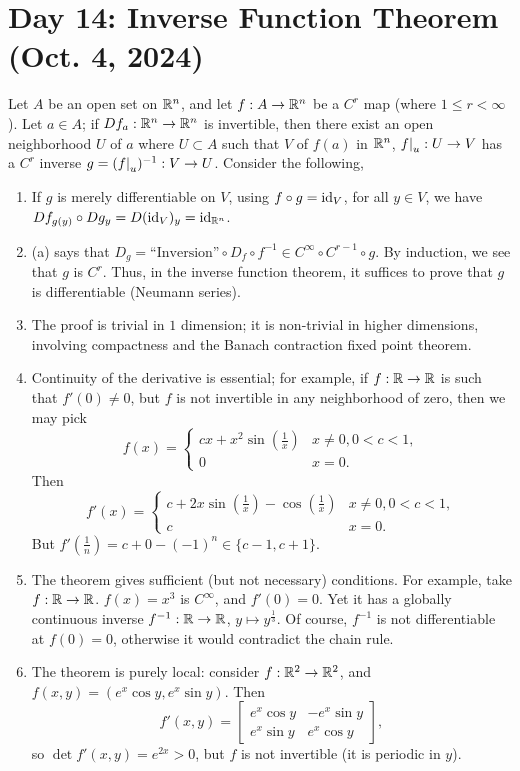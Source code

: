 \section{Day 14: Inverse Function Theorem (Oct. 4, 2024)}
Let $A$ be an open set on $\mathbb R^n$, and let $f : A \to \mathbb R^n$ be a $C^r$ map (where $1 \leq r < \infty$). Let $a \in A$; if $D f_a : \mathbb R^n \to \mathbb R^n$ is invertible, then there exist an open neighborhood $U$ of $a$ where $U \subset A$ such that $V$ of $f(a)$ in $\mathbb R^n$, $\restr{f}{u} : U \to V$ has a $C^r$ inverse $g = (\restr{f}{u})^{-1} : V \to U$. Consider the following,
\begin{enumerate}[label=(\alph*)]
    \item If $g$ is merely differentiable on $V$, using $f \circ g = \mathrm{id}_V$, for all $y \in V$, we have $D f_{g(y)} \circ D g_y = D(\mathrm{id}_V)_y = \mathrm{id}_{\mathbb R^n}$.
    \item (a) says that $D_g = \text{``Inversion''} \circ D_f \circ f^{-1} \in C^{\infty} \circ C^{r-1} \circ g$. By induction, we see that $g$ is $C^r$. Thus, in the inverse function theorem, it suffices to prove that $g$ is differentiable (Neumann series).
    \item The proof is trivial in $1$ dimension; it is non-trivial in higher dimensions, involving compactness and the Banach contraction fixed point theorem.
    \item Continuity of the derivative is essential; for example, if $f : \mathbb R \to \mathbb R$ is such that $f'(0) \neq 0$, but $f$ is not invertible in any neighborhood of zero, then we may pick
    \[ f(x) = \begin{cases} cx + x^2 \sin \left(\frac{1}{x}\right) & x \neq 0, 0 < c < 1, \\ 0 & x = 0. \end{cases} \]
    Then
    \[ f'(x) = \begin{cases} c+ 2x \sin\left(\frac{1}{x}\right) - \cos\left(\frac{1}{x}\right) & x \neq 0, 0 < c < 1, \\ c & x = 0. \end{cases} \]
    But $f'(\frac{1}{n}) = c + 0 - (-1)^n \in \{c-1, c+1\}$.
    \item The theorem gives sufficient (but not necessary) conditions. For example, take $f : \mathbb R \to \mathbb R$. $f(x) = x^3$ is $C^\infty$, and $f'(0) = 0$. Yet it has a globally continuous inverse $f^{-1} : \mathbb R \to \mathbb R$, $y \mapsto y^{\frac{1}{3}}$. Of course, $f^{-1}$ is not differentiable at $f(0) = 0$, otherwise it would contradict the chain rule.
    \item The theorem is purely local: consider $f : \mathbb R^2 \to \mathbb R^2$, and $f(x, y) = (e^x \cos y, e^x \sin y)$. Then
    \[ f'(x, y) = \begin{bmatrix} e^x \cos y & -e^x \sin y \\ e^x \sin y & e^x \cos y \end{bmatrix}, \] 
    so $\det f'(x, y) = e^{2x} > 0$, but $f$ is not invertible (it is periodic in $y$).
\end{enumerate}
